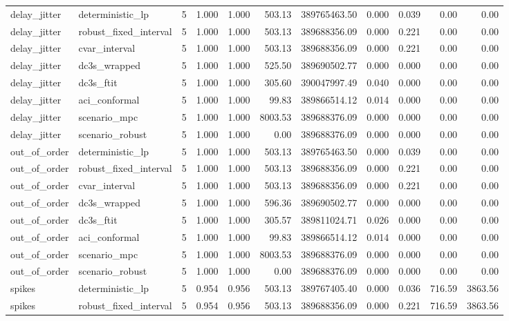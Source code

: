 \begin{tabular}{llrrrrrrrrr}
delay\_jitter & deterministic\_lp & 5 & 1.000 & 1.000 & 503.13 & 389765463.50 & 0.000 & 0.039 & 0.00 & 0.00 \\
delay\_jitter & robust\_fixed\_interval & 5 & 1.000 & 1.000 & 503.13 & 389688356.09 & 0.000 & 0.221 & 0.00 & 0.00 \\
delay\_jitter & cvar\_interval & 5 & 1.000 & 1.000 & 503.13 & 389688356.09 & 0.000 & 0.221 & 0.00 & 0.00 \\
delay\_jitter & dc3s\_wrapped & 5 & 1.000 & 1.000 & 525.50 & 389690502.77 & 0.000 & 0.000 & 0.00 & 0.00 \\
delay\_jitter & dc3s\_ftit & 5 & 1.000 & 1.000 & 305.60 & 390047997.49 & 0.040 & 0.000 & 0.00 & 0.00 \\
delay\_jitter & aci\_conformal & 5 & 1.000 & 1.000 & 99.83 & 389866514.12 & 0.014 & 0.000 & 0.00 & 0.00 \\
delay\_jitter & scenario\_mpc & 5 & 1.000 & 1.000 & 8003.53 & 389688376.09 & 0.000 & 0.000 & 0.00 & 0.00 \\
delay\_jitter & scenario\_robust & 5 & 1.000 & 1.000 & 0.00 & 389688376.09 & 0.000 & 0.000 & 0.00 & 0.00 \\
out\_of\_order & deterministic\_lp & 5 & 1.000 & 1.000 & 503.13 & 389765463.50 & 0.000 & 0.039 & 0.00 & 0.00 \\
out\_of\_order & robust\_fixed\_interval & 5 & 1.000 & 1.000 & 503.13 & 389688356.09 & 0.000 & 0.221 & 0.00 & 0.00 \\
out\_of\_order & cvar\_interval & 5 & 1.000 & 1.000 & 503.13 & 389688356.09 & 0.000 & 0.221 & 0.00 & 0.00 \\
out\_of\_order & dc3s\_wrapped & 5 & 1.000 & 1.000 & 596.36 & 389690502.77 & 0.000 & 0.000 & 0.00 & 0.00 \\
out\_of\_order & dc3s\_ftit & 5 & 1.000 & 1.000 & 305.57 & 389811024.71 & 0.026 & 0.000 & 0.00 & 0.00 \\
out\_of\_order & aci\_conformal & 5 & 1.000 & 1.000 & 99.83 & 389866514.12 & 0.014 & 0.000 & 0.00 & 0.00 \\
out\_of\_order & scenario\_mpc & 5 & 1.000 & 1.000 & 8003.53 & 389688376.09 & 0.000 & 0.000 & 0.00 & 0.00 \\
out\_of\_order & scenario\_robust & 5 & 1.000 & 1.000 & 0.00 & 389688376.09 & 0.000 & 0.000 & 0.00 & 0.00 \\
spikes & deterministic\_lp & 5 & 0.954 & 0.956 & 503.13 & 389767405.40 & 0.000 & 0.036 & 716.59 & 3863.56 \\
spikes & robust\_fixed\_interval & 5 & 0.954 & 0.956 & 503.13 & 389688356.09 & 0.000 & 0.221 & 716.59 & 3863.56 \\

\end{tabular}
